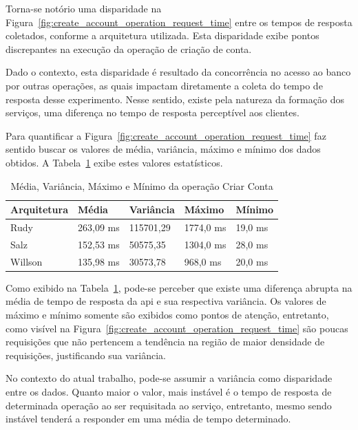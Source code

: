 Torna-se notório uma disparidade na Figura~\ref{fig:create_account_operation_request_time} entre os tempos de resposta coletados, conforme a arquitetura utilizada.
%
Esta disparidade exibe pontos discrepantes na execução da operação de criação de conta.

Dado o contexto, esta disparidade é resultado da concorrência no acesso ao banco por outras operações, as quais impactam diretamente a coleta do tempo de resposta desse experimento.
%
Nesse sentido, existe pela natureza da formação dos serviços, uma diferença no tempo de resposta perceptível aos clientes.

Para quantificar a Figura~\ref{fig:create_account_operation_request_time} faz sentido buscar os valores de média, variância, máximo e mínimo dos dados obtidos.
%
A Tabela~\ref{tab:create_account_operation_request_time} exibe estes valores estatísticos.

\begin{table}[htb!]
\centering
\begin{adjustbox}{max width=\textwidth}
\caption{Média, Variância, Máximo e Mínimo da operação Criar Conta}
\label{tab:create_account_operation_request_time}
\begin{tabular}{l|l|l|l|l}
\hline \hline
Arquitetura & Média     & Variância & Máximo    & Mínimo  \\ \hline \hline
Rudy        & 263,09 ms & 115701,29 & 1774,0 ms & 19,0 ms \\ \hline
Salz        & 152,53 ms & 50575,35  & 1304,0 ms & 28,0 ms \\ \hline
Willson     & 135,98 ms & 30573,78  & 968,0 ms  & 20,0 ms \\ \hline \hline
\end{tabular}

\end{adjustbox}
\end{table}

Como exibido na Tabela~\ref{tab:create_account_operation_request_time}, pode-se perceber que existe uma diferença abrupta na média de tempo de resposta da \ac{api} e sua respectiva variância.
%
Os valores de máximo e mínimo somente são exibidos como pontos de atenção, entretanto, como visível na Figura~\ref{fig:create_account_operation_request_time} são poucas requisições que não pertencem a tendência na região de maior densidade de requisições, justificando sua variância.

No contexto do atual trabalho, pode-se assumir a variância como disparidade entre os dados.
%
Quanto maior o valor, mais instável é o tempo de resposta de determinada operação ao ser requisitada ao serviço, entretanto, mesmo sendo instável tenderá a responder em uma média de tempo determinado.


